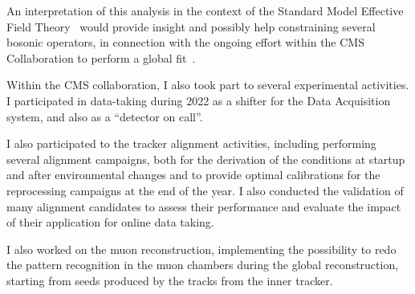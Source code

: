 An interpretation of this analysis in the context of the Standard Model Effective Field Theory~
would provide insight and possibly help constraining several bosonic operators,
in connection with the ongoing effort within the CMS Collaboration to perform a global fit~.

Within the CMS collaboration, I also took part to several experimental activities.
I participated in data-taking during 2022 as a shifter for the Data Acquisition system,
and also as a ``detector on call''.

I also participated to the tracker alignment activities,
including performing several alignment campaigns,
both for the derivation of the conditions at startup and after environmental changes
and to provide optimal calibrations for the reprocessing campaigns at the end of the year.
I also conducted the validation of many alignment candidates to assess their performance
and evaluate the impact of their application for online data taking.

I also worked on the muon reconstruction, implementing the possibility to redo
the pattern recognition in the muon chambers during the global reconstruction,
starting from seeds produced by the tracks from the inner tracker.
